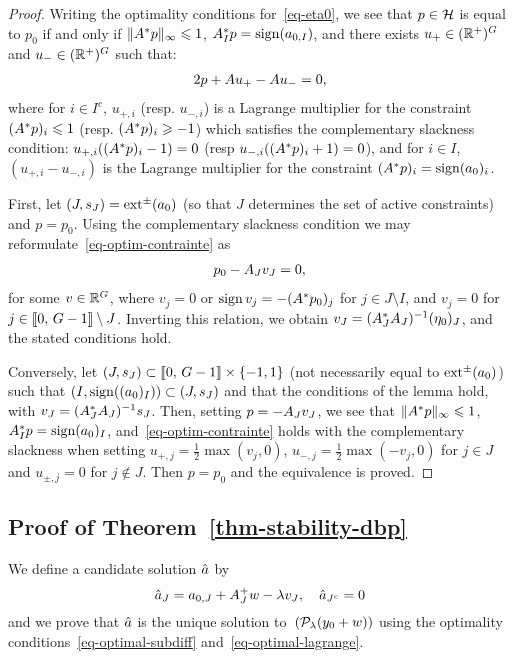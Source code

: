 \begin{proof}
  Writing the optimality conditions for~\eqref{eq-eta0}, we see that $p\in\mathcal{H}$ is equal to $p_0$ if and only if ${\|A^*p\|_{\infty}}\leqslant 1$, $A_I^*p=\operatorname{sign} (a_{0,I})$, and there exists $u_+\in (\mathbb{R}^+)^G$ and $u_-\in (\mathbb{R}^+)^G$ such that:
\begin{align}
  2p+ A u_+ - A u_- =0,
  \label{eq-optim-contrainte}
\end{align}
where for $i\in I^c$, $u_{+,i}$ (resp. $u_{-,i}$) is a Lagrange multiplier for the constraint $(A^*p)_i\leqslant 1$ (resp. $(A^*p)_i\geqslant -1$) which satisfies  the complementary slackness condition: $u_{+,i}((A^*p)_i- 1)=0$ (resp $u_{-,i}((A^*p)_i+1)=0$), and for $i\in I$, $(u_{+,i}-u_{-,i})$ is the Lagrange multiplier for the constraint $(A^*p)_i=\operatorname{sign}(a_0)_i$.

First, let $(J,s_J)=\operatorname{ext^{\pm}}(a_0)$ (so that $J$ determines the set of active constraints) and $p=p_0$. Using the complementary slackness condition we may reformulate~\eqref{eq-optim-contrainte} as 
\begin{align}\label{eq:valpzero}
  p_0- A_J v_J=0,
\end{align}
for some $v\in \mathbb{R}^{G}$, where $v_j=0$ or $\operatorname{sign} v_j= -(A^*p_0)_j$ for $j\in J\setminus I$, and $v_j=0$ for $j\in\llbracket 0,\,G-1 \rrbracket\setminus J$. Inverting this relation, we obtain $v_J=(A_J^*A_J)^{-1}(\eta_0)_J$, and the stated conditions hold.

Conversely, let $(J,s_J)\subset \llbracket 0,\,G-1 \rrbracket\times\{-1,1\}$ (not necessarily equal to $\operatorname{ext^{\pm}}(a_0)$) such that $(I,\operatorname{sign}((a_0)_I))\subset (J,s_J)$ and that the conditions of the lemma hold, with $v_J=(A_J^*A_J)^{-1}s_J$. Then, setting $p=-A_J v_J$, we see that $\|A^* p\|_\infty\leqslant 1$, $A_I^*p=\operatorname{sign} (a_0)_I$, and~\eqref{eq-optim-contrainte} holds with the complementary slackness when setting $u_{+,j}=\frac{1}{2} \max(v_j,0)$, $u_{-,j}=\frac{1}{2} \max(-v_j,0)$ for $j\in J$ and $u_{\pm,j}=0$ for $j\notin J$. Then $p=p_0$ and the equivalence is proved.
\end{proof}

\subsection{Proof of Theorem~\ref{thm-stability-dbp}}

	We define a candidate solution $\hat {a}$ by 
  \begin{equation}\label{eq:defcandidate}
		\hat{a}_J = a_{0,J} + A_J^+ w - \lambda v_{J}, \quad \hat {a}_{J^c}=0
  \end{equation}
  and we prove that $\hat {a}$ is the unique solution to~$(\mathcal{P}_\lambda(y_0+w))$ using the optimality conditions~\eqref{eq-optimal-subdiff} and~\eqref{eq-optimal-lagrange}. 
	
